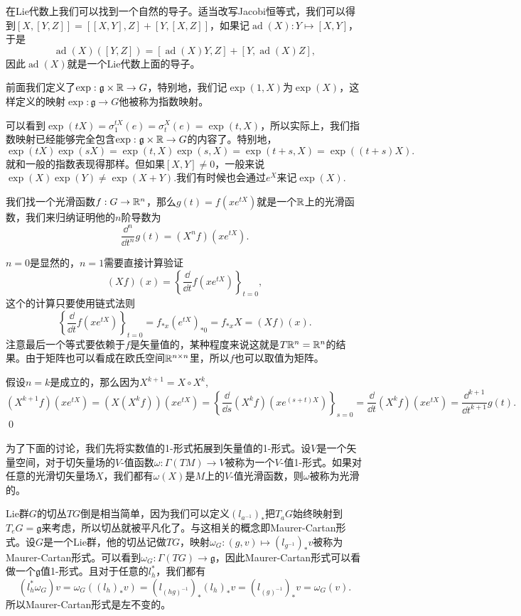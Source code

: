 \documentclass[9pt]{extarticle}
\newcommand{\lag}{{\mathfrak{g}}}
\DeclareMathOperator{\ad}{ad}
\begin{document}
在Lie代数上我们可以找到一个自然的导子。适当改写Jacobi恒等式，我们可以得到$[X,[Y,Z]]=[[X,Y],Z]+[Y,[X,Z]]$，如果记$\ad(X):Y\mapsto [X,Y]$，于是
\[
	\ad(X)([Y,Z])=[\ad(X)Y,Z]+[Y,\ad(X)Z],
\]
因此$\ad(X)$就是一个Lie代数上面的导子。

\para 前面我们定义了$\exp:\lag\times \rr\to G$，特别地，我们记$\exp(1,X)$为$\exp(X)$，这样定义的映射$\exp:\lag\to G$他被称为指数映射。

可以看到$\exp(tX)=\sigma^{tX}_1(e)=\sigma^{X}_t(e)=\exp(t,X)$，所以实际上，我们指数映射已经能够完全包含$\exp:\lag\times \rr\to G$的内容了。特别地，
\[
	\exp(tX)\exp(sX)=\exp(t,X)\exp(s,X)=\exp(t+s,X)=\exp((t+s)X).
\]
就和一般的指数表现得那样。但如果$[X,Y]\neq 0$，一般来说$\exp(X)\exp(Y)\neq \exp(X+Y)$.我们有时候也会通过$e^{X}$来记$\exp(X)$.

\lem \label{exp}我们找一个光滑函数$f:G\to \mathbb{R}^n$，那么$g(t)=f(xe^{tX})$就是一个$\mathbb{R}$上的光滑函数，我们来归纳证明他的$n$阶导数为
\[
	\frac{\dd^n}{\dd t^n}g(t)=(X^nf)(x e^{tX}).
\]

\proof $n=0$是显然的，$n=1$需要直接计算验证
\[
	(Xf)(x)=\left\{\frac{\dd}{\dd t}f(x e^{tX})\right\}_{t=0},
\]
这个的计算只要使用链式法则
\[
	\left\{\frac{\dd}{\dd t}f(x e^{tX})\right\}_{t=0}=f_{*x}(e^{tX})_{*0}=f_{*x}X=(Xf)(x).
\]
注意最后一个等式要依赖于$f$是矢量值的，某种程度来说这就是$T\mathbb{R}^n=\mathbb{R}^n$的结果。由于矩阵也可以看成在欧氏空间$\mathbb{R}^{n\times n}$里，所以$f$也可以取值为矩阵。

假设$n=k$是成立的，那么因为$X^{k+1}=X\circ X^k$,
\[
	(X^{k+1}f)(x e^{tX})=(X(X^{k}f))(x e^{tX})=\left\{\frac{\dd}{\dd s}(X^kf)(x e^{(s+t)X})\right\}_{s=0}=\frac{\dd}{\dd t}(X^kf)(x e^{tX})=\frac{\dd^{k+1}}{\dd t^{k+1}}g(t).
\]\qed

\para 为了下面的讨论，我们先将实数值的1-形式拓展到矢量值的1-形式。设$V$是一个矢量空间，对于切矢量场的$V$-值函数$\omega:\Gamma(TM)\to V$被称为一个$V$-值1-形式。如果对任意的光滑切矢量场$X$，我们都有$\omega(X)$是$M$上的$V$-值光滑函数，则$\omega$被称为光滑的。

\para Lie群$G$的切丛$TG$倒是相当简单，因为我们可以定义$(l_{a^{-1}})_*$把$T_aG$始终映射到$T_eG=\lag$来考虑，所以切丛就被平凡化了。与这相关的概念即Maurer-Cartan形式。设$G$是一个Lie群，他的切丛记做$TG$，映射$\omega_G:(g,v)\mapsto (l_{g^{-1}})_*v$被称为Maurer-Cartan形式。可以看到$\omega_G:\Gamma(TG)\to \lag$，因此Maurer-Cartan形式可以看做一个$\lag$值1-形式。且对于任意的$l_h^*$，我们都有
\[
	(l_h^*\omega_G)v=\omega_G((l_h)_*v)=(l_{(hg)^{-1}})_*(l_h)_*v=(l_{(g)^{-1}})_*v=\omega_G(v).
\]
所以Maurer-Cartan形式是左不变的。
\end{document}
